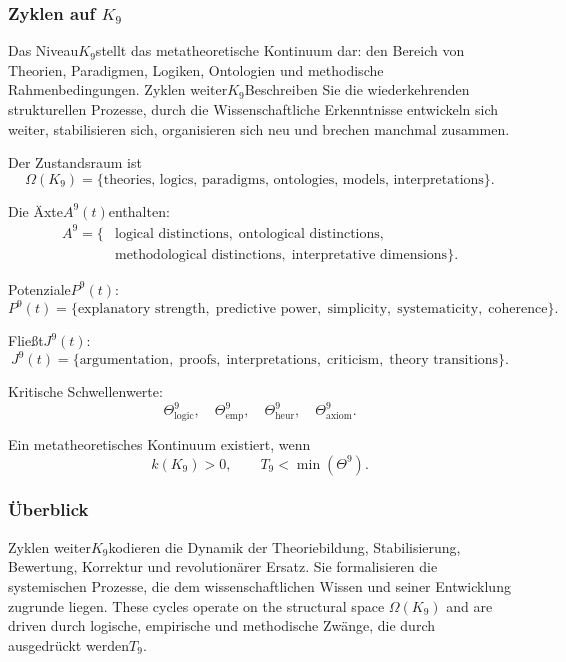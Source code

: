 
\subsubsection{Zyklen auf \texorpdfstring{$K_9$}{K_9}}
\label{sec:cycles-k9}

Das Niveau$K_9$stellt das metatheoretische Kontinuum dar: den Bereich von
Theorien, Paradigmen, Logiken, Ontologien und methodische Rahmenbedingungen.
Zyklen weiter$K_9$Beschreiben Sie die wiederkehrenden strukturellen Prozesse, durch die
Wissenschaftliche Erkenntnisse entwickeln sich weiter, stabilisieren sich, organisieren sich neu und brechen manchmal zusammen.

Der Zustandsraum ist
\[
  \Omega(K_9)
  =
  \{\text{theories, logics, paradigms, ontologies, models, interpretations}\}.
\]

Die Äxte$A^9(t)$enthalten:
\[
  \begin{aligned}
  A^9 = \{&
     \text{logical distinctions},\;
     \text{ontological distinctions},\\
     &\text{methodological distinctions},\;
     \text{interpretative dimensions}
  \}.
  \end{aligned}
\]

Potenziale$P^9(t)$:
\[
P^9(t)
  = \{\text{explanatory strength},\; \text{predictive power},\;
        \text{simplicity},\; \text{systematicity},\; \text{coherence}\}.
\]

Fließt$J^9(t)$:
\[
  J^9(t) = \{
    \text{argumentation},\;
    \text{proofs},\;
    \text{interpretations},\;
    \text{criticism},\;
    \text{theory transitions}
  \}.
\]

Kritische Schwellenwerte:
\[
  \Theta^9_\mathrm{logic},\quad
  \Theta^9_\mathrm{emp},\quad
  \Theta^9_\mathrm{heur},\quad
  \Theta^9_\mathrm{axiom}.
\]

Ein metatheoretisches Kontinuum existiert, wenn
\[
  k(K_9)>0,\qquad
  T_9 < \min(\Theta^9).
\]


\subsubsection{Überblick}

Zyklen weiter$K_9$kodieren die Dynamik der Theoriebildung, Stabilisierung,
Bewertung, Korrektur und revolutionärer Ersatz. Sie formalisieren
die systemischen Prozesse, die dem wissenschaftlichen Wissen und seiner Entwicklung zugrunde liegen.
These cycles operate on the structural space $\Omega(K_9)$ and are driven
durch logische, empirische und methodische Zwänge, die durch ausgedrückt werden$T_9$.


